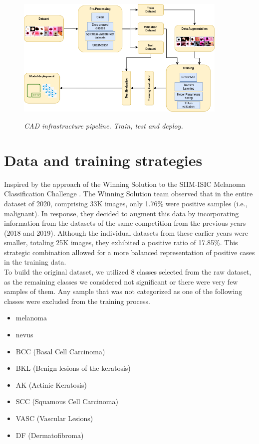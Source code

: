 \begin{figure}[H]
  \centering
  \includegraphics[width=0.9\textwidth]{imatges/methodological_contribution/Pipeline.drawio.png}
  \caption{\textit{CAD infrastructure pipeline. Train, test and deploy. }}
  {\label{fig:cad-pipeline}}
\end{figure}

\section{Data and training strategies}

Inspired by the approach of the Winning Solution to the SIIM-ISIC Melanoma
Classification Challenge \cite{WinningISIC}. The Winning Solution team observed
that in the entire dataset of 2020, comprising 33K images, only 1.76\% were
positive samples (i.e., malignant). In response, they decided to augment this
data by incorporating information from the datasets of the same competition
from the previous years (2018 and 2019). Although the individual datasets from
these earlier years were smaller, totaling 25K images, they exhibited a
positive ratio of 17.85\%. This strategic combination allowed for a more
balanced representation of positive cases in the training data. \\

To build the original dataset, we utilized 8 classes selected from the raw
dataset, as the remaining classes we considered not significant or there were
very few samples of them. Any sample that was not categorized as one of the
following classes were excluded from the training process.

\begin{itemize}
  \item melanoma
  \item nevus
  \item BCC (Basal Cell Carcinoma)
  \item BKL (Benign lesions of the keratosis)
  \item AK (Actinic Keratosis)
  \item SCC (Squamous Cell Carcinoma)
  \item VASC (Vascular Lesions)
  \item DF (Dermatofibroma)
\end{itemize}


